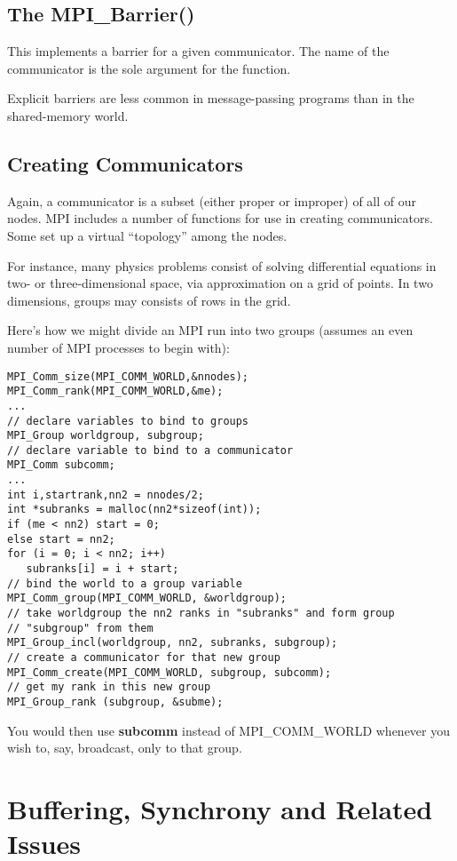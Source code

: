 \subsection{The MPI\_Barrier()}  

This implements a barrier for a given communicator.  The name of the
communicator is the sole argument for the function.  

Explicit barriers are less common in message-passing programs than in
the shared-memory world.

\subsection{Creating Communicators} 

Again, a communicator is a subset (either proper or improper) of all of
our nodes.  MPI includes a number of functions for use in creating
communicators.  Some set up a virtual ``topology'' among the nodes.  

For instance, many physics problems consist of solving differential
equations in two- or three-dimensional space, via approximation on a
grid of points.  In two dimensions, groups may consists of rows in the
grid.

Here's how we might divide an MPI run into two groups (assumes an even
number of MPI processes to begin with):

\begin{Verbatim}[fontsize=\relsize{-2}]
MPI_Comm_size(MPI_COMM_WORLD,&nnodes);
MPI_Comm_rank(MPI_COMM_WORLD,&me);
...
// declare variables to bind to groups
MPI_Group worldgroup, subgroup; 
// declare variable to bind to a communicator
MPI_Comm subcomm; 
...
int i,startrank,nn2 = nnodes/2;
int *subranks = malloc(nn2*sizeof(int));
if (me < nn2) start = 0;
else start = nn2;
for (i = 0; i < nn2; i++) 
   subranks[i] = i + start;
// bind the world to a group variable
MPI_Comm_group(MPI_COMM_WORLD, &worldgroup); 
// take worldgroup the nn2 ranks in "subranks" and form group 
// "subgroup" from them 
MPI_Group_incl(worldgroup, nn2, subranks, subgroup);
// create a communicator for that new group
MPI_Comm_create(MPI_COMM_WORLD, subgroup, subcomm); 
// get my rank in this new group
MPI_Group_rank (subgroup, &subme); 
\end{Verbatim}

You would then use {\bf subcomm} instead of MPI\_COMM\_WORLD
whenever you wish to, say, broadcast, only to that group.

\section{Buffering, Synchrony and Related Issues}

